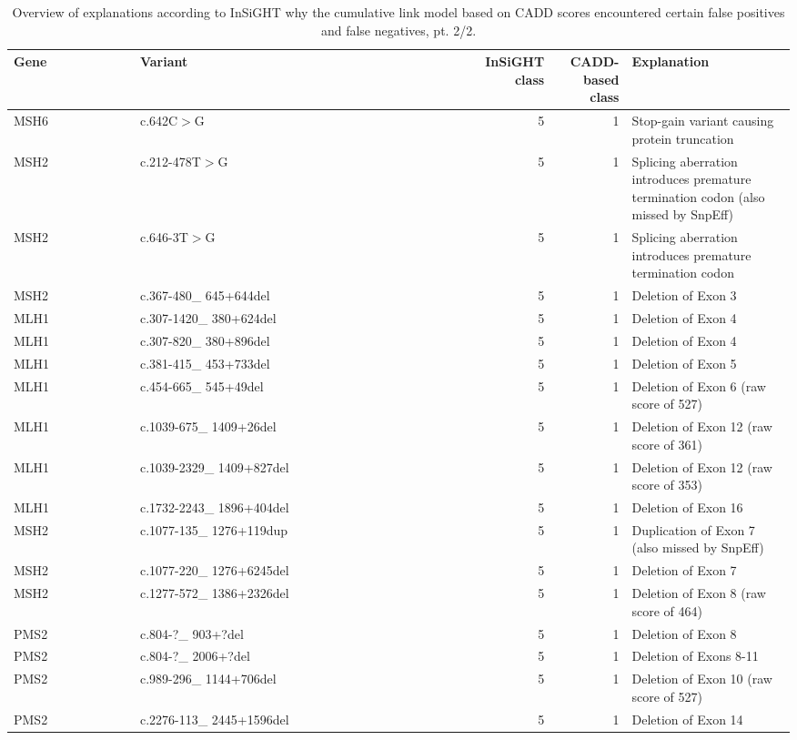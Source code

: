 \begin{table}
\footnotesize
\begin{tabulary}{\linewidth}{LLRRL}
  \mbox{Gene~~~~~~~~~~~} & \mbox{Variant~~~~~~~~~~~~~~~~~~~~~~~~~~~~~~~~~~~~~~} & InSiGHT class & CADD-based class & Explanation \\
  \hline
  \rule{0pt}{1.5ex}MSH6 & c.642C$>$G & 5 & 1 & Stop-gain variant causing protein truncation \\
  \rule{0pt}{1.5ex}MSH2 & c.212-478T$>$G & 5 & 1 & Splicing aberration introduces premature termination codon (also missed by SnpEff) \\
  \rule{0pt}{1.5ex}MSH2 & c.646-3T$>$G & 5 & 1 & Splicing aberration introduces premature termination codon \\
  \rule{0pt}{1.5ex}MSH2 & c.367-480\_ 645+644del & 5 & 1 & Deletion of Exon 3 \\
  \rule{0pt}{1.5ex}MLH1 & c.307-1420\_ 380+624del & 5 & 1 & Deletion of Exon 4 \\
  \rule{0pt}{1.5ex}MLH1 & c.307-820\_ 380+896del & 5 & 1 & Deletion of Exon 4 \\
  \rule{0pt}{1.5ex}MLH1 & c.381-415\_ 453+733del & 5 & 1 & Deletion of Exon 5 \\
  \rule{0pt}{1.5ex}MLH1 & c.454-665\_ 545+49del & 5 & 1 & Deletion of Exon 6 (raw score of 527) \\
  \rule{0pt}{1.5ex}MLH1 & c.1039-675\_ 1409+26del & 5 & 1 & Deletion of Exon 12 (raw score of 361) \\
  \rule{0pt}{1.5ex}MLH1 & c.1039-2329\_ 1409+827del & 5 & 1 & Deletion of Exon 12 (raw score of 353) \\
  \rule{0pt}{1.5ex}MLH1 & c.1732-2243\_ 1896+404del & 5 & 1 & Deletion of Exon 16 \\
  \rule{0pt}{1.5ex}MSH2 & c.1077-135\_ 1276+119dup & 5 & 1 & Duplication of Exon 7 (also missed by SnpEff) \\
  \rule{0pt}{1.5ex}MSH2 & c.1077-220\_ 1276+6245del & 5 & 1 & Deletion of Exon 7 \\
  \rule{0pt}{1.5ex}MSH2 & c.1277-572\_ 1386+2326del & 5 & 1 & Deletion of Exon 8 (raw score of 464) \\
  \rule{0pt}{1.5ex}PMS2 & c.804-?\_ 903+?del & 5 & 1 & Deletion of Exon 8 \\
  \rule{0pt}{1.5ex}PMS2 & c.804-?\_ 2006+?del & 5 & 1 & Deletion of Exons 8-11 \\
  \rule{0pt}{1.5ex}PMS2 & c.989-296\_ 1144+706del & 5 & 1 & Deletion of Exon 10 (raw score of 527) \\
  \rule{0pt}{1.5ex}PMS2 & c.2276-113\_ 2445+1596del & 5 & 1 & Deletion of Exon 14 \\
  \hline
\end{tabulary}
\caption[Explanations according to InSiGHT, pt. 2/2]{\label{table:caddmmr_explanations2} Overview of explanations according to InSiGHT why the cumulative link model based on CADD scores encountered certain false positives and false negatives, pt. 2/2.}
\end{table}

